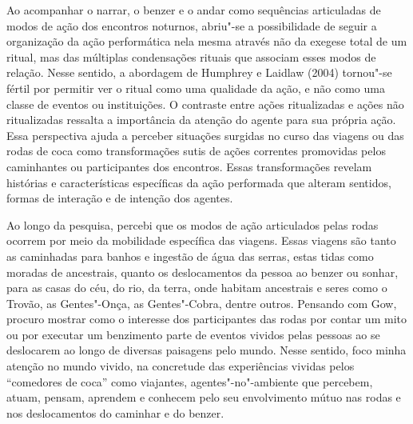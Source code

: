 Ao acompanhar o narrar, o benzer e o andar como sequências articuladas
de modos de ação dos encontros noturnos, abriu"-se a possibilidade de
seguir a organização da ação performática nela mesma através não da
exegese total de um ritual, mas das múltiplas condensações rituais que
associam esses modos de relação. Nesse sentido, a abordagem de Humphrey
e Laidlaw (2004) tornou"-se fértil por permitir ver o ritual como uma
qualidade da ação, e não como uma classe de eventos ou instituições. O
contraste entre ações ritualizadas e ações não ritualizadas ressalta a
importância da atenção do agente para sua própria ação. Essa perspectiva
ajuda a perceber situações surgidas no curso das viagens ou das rodas de
coca como transformações sutis de ações correntes promovidas pelos
caminhantes ou participantes dos encontros. Essas transformações revelam
histórias e características específicas da ação performada que alteram
sentidos, formas de interação e de intenção dos agentes.

Ao longo da pesquisa, percebi que os modos de ação articulados pelas
rodas ocorrem por meio da mobilidade específica das viagens. Essas
viagens são tanto as caminhadas para banhos e ingestão de água das
serras, estas tidas como moradas de ancestrais, quanto os deslocamentos
da pessoa ao benzer ou sonhar, para as casas do céu, do rio, da terra,
onde habitam ancestrais e seres como o Trovão, as Gentes"-Onça, as
Gentes"-Cobra, dentre outros. Pensando com Gow, procuro mostrar como o
interesse dos participantes das rodas por contar um mito ou por executar
um benzimento parte de eventos vividos pelas pessoas ao se deslocarem ao
longo de diversas paisagens pelo mundo. Nesse sentido, foco minha
atenção no mundo vivido, na concretude das experiências vividas pelos
``comedores de coca'' como viajantes, agentes"-no"-ambiente que percebem,
atuam, pensam, aprendem e conhecem pelo seu envolvimento mútuo nas rodas
e nos deslocamentos do caminhar e do benzer.

